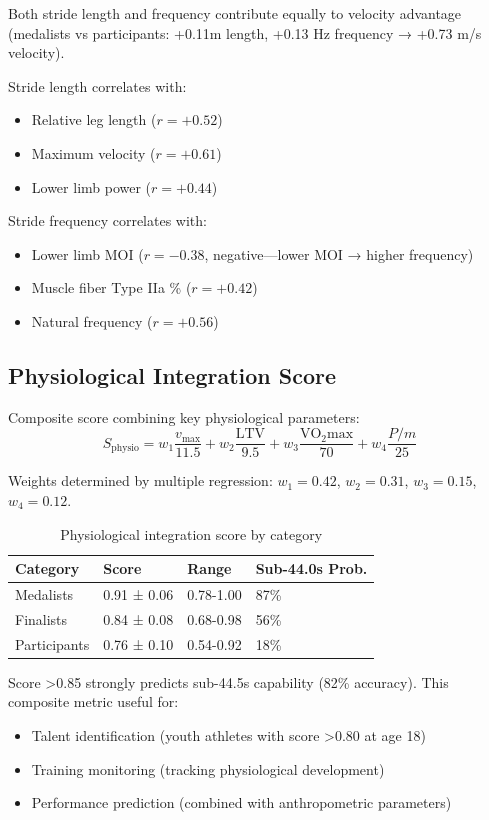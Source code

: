 Both stride length and frequency contribute equally to velocity advantage (medalists vs participants: +0.11m length, +0.13 Hz frequency → +0.73 m/s velocity).

Stride length correlates with:
\begin{itemize}
    \item Relative leg length ($r = +0.52$)
    \item Maximum velocity ($r = +0.61$)
    \item Lower limb power ($r = +0.44$)
\end{itemize}

Stride frequency correlates with:
\begin{itemize}
    \item Lower limb MOI ($r = -0.38$, negative—lower MOI → higher frequency)
    \item Muscle fiber Type IIa \% ($r = +0.42$)
    \item Natural frequency ($r = +0.56$)
\end{itemize}

\subsection{Physiological Integration Score}

Composite score combining key physiological parameters:
\begin{equation}
S_{\text{physio}} = w_1 \frac{v_{\max}}{11.5} + w_2 \frac{\text{LTV}}{9.5} + w_3 \frac{\text{VO}_2\text{max}}{70} + w_4 \frac{P/m}{25}
\end{equation}

Weights determined by multiple regression: $w_1 = 0.42$, $w_2 = 0.31$, $w_3 = 0.15$, $w_4 = 0.12$.

\begin{table}[H]
\centering
\caption{Physiological integration score by category}
\begin{tabular}{@{}llll@{}}
\toprule
\textbf{Category} & \textbf{Score} & \textbf{Range} & \textbf{Sub-44.0s Prob.} \\
\midrule
Medalists & 0.91 ± 0.06 & 0.78-1.00 & 87\% \\
Finalists & 0.84 ± 0.08 & 0.68-0.98 & 56\% \\
Participants & 0.76 ± 0.10 & 0.54-0.92 & 18\% \\
\bottomrule
\end{tabular}
\end{table}

Score >0.85 strongly predicts sub-44.5s capability (82\% accuracy). This composite metric useful for:
\begin{itemize}
    \item Talent identification (youth athletes with score >0.80 at age 18)
    \item Training monitoring (tracking physiological development)
    \item Performance prediction (combined with anthropometric parameters)
\end{itemize}

